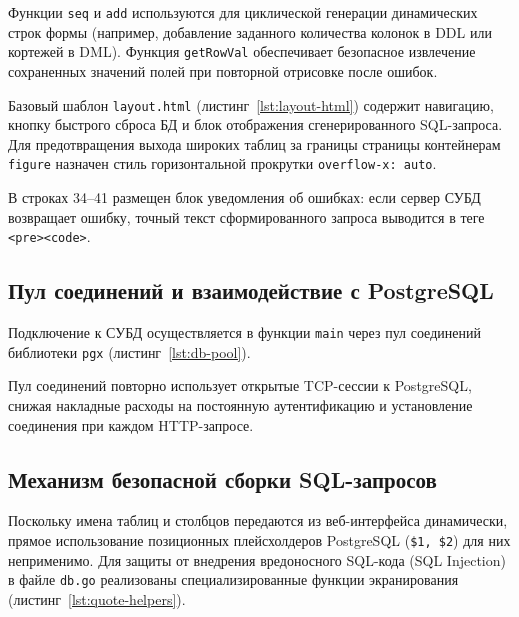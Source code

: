 Функции \texttt{seq} и \texttt{add} используются для циклической генерации динамических строк формы (например, добавление заданного количества колонок в DDL или кортежей в DML). Функция \texttt{getRowVal} обеспечивает безопасное извлечение сохраненных значений полей при повторной отрисовке после ошибок.

Базовый шаблон \texttt{layout.html} (листинг~\ref{lst:layout-html}) содержит навигацию, кнопку быстрого сброса БД и блок отображения сгенерированного SQL-запроса. Для предотвращения выхода широких таблиц за границы страницы контейнерам \texttt{figure} назначен стиль горизонтальной прокрутки \texttt{overflow-x: auto}.

\begin{listing}[H]
    \caption{Разметка контейнера и блок аудита SQL в \texttt{layout.html}}
    \label{lst:layout-html}
\end{listing}

В строках 34--41 размещен блок уведомления об ошибках: если сервер СУБД возвращает ошибку, точный текст сформированного запроса выводится в теге \texttt{<pre><code>}.

\subsection{Пул соединений и взаимодействие с PostgreSQL}

Подключение к СУБД осуществляется в функции \texttt{main} через пул соединений библиотеки \texttt{pgx} (листинг~\ref{lst:db-pool}).

\begin{listing}[H]
    \caption{Инициализация пула соединений \texttt{pgx}}
    \label{lst:db-pool}
\end{listing}

Пул соединений повторно использует открытые TCP-сессии к PostgreSQL, снижая накладные расходы на постоянную аутентификацию и установление соединения при каждом HTTP-запросе.

\subsection{Механизм безопасной сборки SQL-запросов}

Поскольку имена таблиц и столбцов передаются из веб-интерфейса динамически, прямое использование позиционных плейсхолдеров PostgreSQL (\texttt{\$1, \$2}) для них неприменимо. Для защиты от внедрения вредоносного SQL-кода (SQL Injection) в файле \texttt{db.go} реализованы специализированные функции экранирования (листинг~\ref{lst:quote-helpers}).

